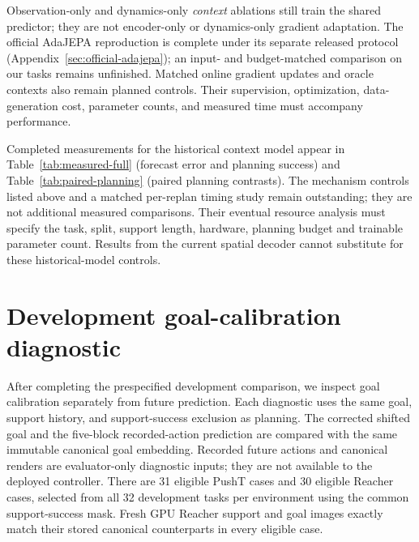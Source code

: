 Observation-only and dynamics-only \emph{context} ablations still train the
shared predictor; they are not encoder-only or dynamics-only gradient
adaptation. The official AdaJEPA reproduction is complete under its separate
released protocol (Appendix~\ref{sec:official-adajepa}); an input- and
budget-matched comparison on our tasks remains unfinished. Matched online
gradient updates and oracle contexts also remain planned controls. Their
supervision, optimization, data-generation cost, parameter counts, and
measured time must accompany performance.

Completed measurements for the historical context model appear in
Table~\ref{tab:measured-full} (forecast error and planning success) and
Table~\ref{tab:paired-planning} (paired planning contrasts). The mechanism
controls listed above and a matched per-replan timing study remain outstanding;
they are not additional measured comparisons. Their eventual resource analysis
must specify the task, split, support length, hardware, planning budget and
trainable parameter count. Results from the current spatial decoder cannot
substitute for these historical-model controls.

\FloatBarrier
\section{Development goal-calibration diagnostic}
\label{sec:goal-calibration}
After completing the prespecified development comparison, we inspect
goal calibration separately from future prediction. Each diagnostic uses
the same goal, support history, and support-success exclusion as planning.
The corrected shifted goal and the five-block recorded-action prediction
are compared with the same immutable canonical goal embedding.
Recorded future actions and canonical renders are evaluator-only diagnostic
inputs; they are not available to the deployed controller. There are
31 eligible PushT cases and 30 eligible Reacher cases, selected from all
32 development tasks per environment using the common support-success mask.
Fresh GPU Reacher support and goal images exactly match their stored
canonical counterparts in every eligible case.

